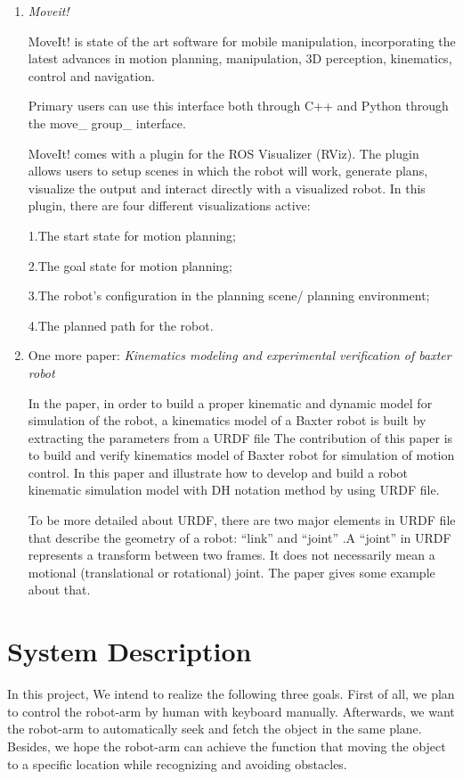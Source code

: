 \documentclass[10pt,twocolumn,letterpaper]{article}
\begin{document}
\begin{enumerate}
\item \textit{Moveit!}

MoveIt! is state of the art software for mobile manipulation, incorporating the latest advances in motion planning, manipulation, 3D perception, kinematics, control and navigation. \par
Primary users can use this interface both through C++ and Python through the move\_ group\_ interface.\par
MoveIt! comes with a plugin for the ROS Visualizer (RViz). The plugin allows users to setup scenes in which the robot will work, generate plans, visualize the output and interact directly with a visualized robot. In this plugin, there are four  different visualizations active:\par
1.The start state for motion planning;\par
2.The goal state for motion planning;\par
3.The robot’s configuration in the planning scene/ planning environment;\par
4.The planned path for the robot.\par

\item One more paper: \textit{Kinematics modeling and experimental verification of baxter robot} \cite{6896430}


In the paper, in order to build a proper kinematic and dynamic model for simulation of the robot, a kinematics model of a Baxter robot is built by extracting the parameters from a URDF file
The contribution of this paper is to build and verify kinematics model of Baxter robot for simulation of motion control. In this paper and illustrate how to develop and build a robot kinematic simulation model with DH notation method by using URDF file.
 
To be more detailed about URDF, there are two major elements in URDF file that describe the geometry of a robot: “link” and “joint” .A “joint” in URDF represents a transform between two frames. It does not necessarily mean a motional (translational or rotational) joint. The paper gives some example about that.
\end{enumerate}

\section{System	Description}

In this project, We intend to realize the following three goals. First of all, we plan to control the robot-arm by human with keyboard manually. Afterwards, we want the robot-arm to automatically seek and fetch the object in the same plane. Besides, we hope the robot-arm can achieve the function that moving the object to a specific location while recognizing and avoiding obstacles.
\end{document}
